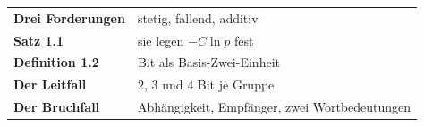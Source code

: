 \begin{merksatz}
\begin{center}
\renewcommand{\arraystretch}{1.5}
\begin{tabular}{@{}P{3.0cm}P{5.6cm}@{}}
\toprule
\textbf{Drei Forderungen} & stetig, fallend, additiv\\
\textbf{Satz 1.1} & sie legen $-C\ln p$ fest\\
\textbf{Definition 1.2} & Bit als Basis-Zwei-Einheit\\
\textbf{Der Leitfall} & $2$, $3$ und $4$ Bit je Gruppe\\
\textbf{Der Bruchfall} & Abhängigkeit, Empfänger, zwei Wortbedeutungen\\
\bottomrule
\end{tabular}
\end{center}

\begin{center}
\begin{minipage}{0.88\textwidth}
\end{minipage}
\end{center}
\end{merksatz}
